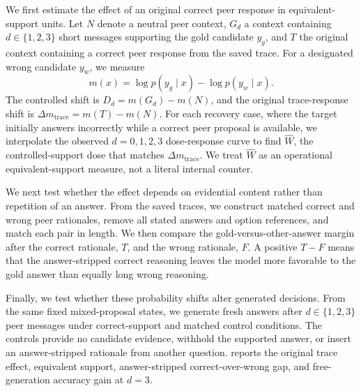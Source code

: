 We first estimate the effect of an original correct peer response in
equivalent-support units. Let $N$ denote a neutral peer context, $G_d$ a context
containing $d\in\{1,2,3\}$ short messages supporting the gold candidate $y_g$,
and $T$ the original context containing a correct peer response from the saved
trace. For a designated wrong candidate $y_w$, we measure
\[
m(x)=\log p(y_g\mid x)-\log p(y_w\mid x).
\]
The controlled shift is $D_d=m(G_d)-m(N)$, and the original trace-response
shift is $\Delta m_{\mathrm{trace}}=m(T)-m(N)$. For each recovery case, where
the target initially answers incorrectly while a correct peer proposal is
available, we interpolate the observed $d=0,1,2,3$ dose-response curve to find
$\widehat W$, the controlled-support dose that matches
$\Delta m_{\mathrm{trace}}$. We treat $\widehat W$ as an operational
equivalent-support measure, not a literal internal counter.

We next test whether the effect depends on evidential content rather than
repetition of an answer. From the saved traces, we construct matched correct
and wrong peer rationales, remove all stated answers and option references, and
match each pair in length. We then compare the gold-versus-other-answer margin
after the correct rationale, $T$, and the wrong rationale, $F$. A positive
$T-F$ means that the answer-stripped correct reasoning leaves the model more
favorable to the gold answer than equally long wrong reasoning.

Finally, we test whether these probability shifts alter generated decisions.
From the same fixed mixed-proposal states, we generate fresh answers after
$d\in\{1,2,3\}$ peer messages under correct-support and matched control
conditions. The controls provide no candidate evidence, withhold the supported
answer, or insert an answer-stripped rationale from another question.
 reports the original trace
effect, equivalent support, answer-stripped correct-over-wrong gap, and
free-generation accuracy gain at $d=3$.

